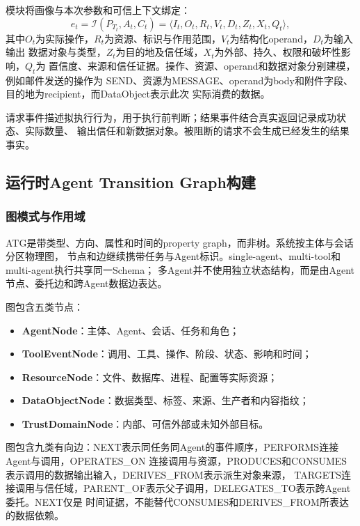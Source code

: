 模块将画像与本次参数和可信上下文绑定：
\begin{equation}
e_t=\mathcal{I}(P_{T_t},A_t,C_t)
=\langle I_t,O_t,R_t,V_t,D_t,Z_t,X_t,Q_t\rangle,
\label{eq:tool-security-event}
\end{equation}
其中$O_t$为实际操作，$R_t$为资源、标识与作用范围，$V_t$为结构化operand，$D_t$为输入输出
数据对象与类型，$Z_t$为目的地及信任域，$X_t$为外部、持久、权限和破坏性影响，$Q_t$为
置信度、来源和信任证据。操作、资源、operand和数据对象分别建模，例如邮件发送的操作为
SEND、资源为MESSAGE、operand为body和附件字段、目的地为recipient，而DataObject表示此次
实际消费的数据。

请求事件描述拟执行行为，用于执行前判断；结果事件结合真实返回记录成功状态、实际数量、
输出信任和新数据对象。被阻断的请求不会生成已经发生的结果事实。

\subsection{运行时Agent Transition Graph构建}
\label{subsec:atg}

\subsubsection{图模式与作用域}

ATG是带类型、方向、属性和时间的property graph，而非树。系统按主体与会话分区物理图，
节点和边继续携带任务与Agent标识。single-agent、multi-tool和multi-agent执行共享同一Schema；
多Agent并不使用独立状态结构，而是由Agent节点、委托边和跨Agent数据边表达。

图包含五类节点：
\begin{itemize}
    \item \textbf{AgentNode}：主体、Agent、会话、任务和角色；
    \item \textbf{ToolEventNode}：调用、工具、操作、阶段、状态、影响和时间；
    \item \textbf{ResourceNode}：文件、数据库、进程、配置等实际资源；
    \item \textbf{DataObjectNode}：数据类型、标签、来源、生产者和内容指纹；
    \item \textbf{TrustDomainNode}：内部、可信外部或未知外部目标。
\end{itemize}

图包含九类有向边：NEXT表示同任务同Agent的事件顺序，PERFORMS连接Agent与调用，OPERATES\_ON
连接调用与资源，PRODUCES和CONSUMES表示调用的数据输出输入，DERIVES\_FROM表示派生对象来源，
TARGETS连接调用与信任域，PARENT\_OF表示父子调用，DELEGATES\_TO表示跨Agent委托。NEXT仅是
时间证据，不能替代CONSUMES和DERIVES\_FROM所表达的数据依赖。

